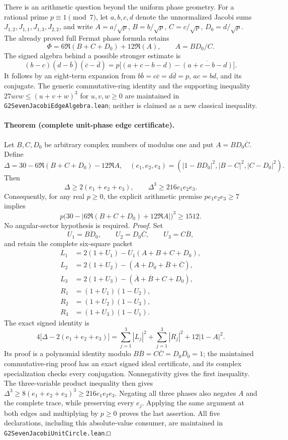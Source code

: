 \documentclass[11pt]{article}
\renewcommand{\square}{\mathord{\vcenter{\hrule\hbox{\vrule height .45em\kern .45em\vrule}\hrule}}}
\begin{document}
There is an arithmetic question beyond the uniform phase geometry.
For a rational prime \(p\equiv1\pmod7\), let \(a,b,c,d\) denote the
unnormalized Jacobi sums \(J_{1,2},J_{1,1},J_{1,3},J_{2,2}\), and
write \(A=a/\sqrt p\), \(B=b/\sqrt p\), \(C=c/\sqrt p\), \(D_0=d/\sqrt p\).
The already proved full Fermat phase formula retains
\[
 \Phi=6\Re(B+C+D_0)+12\Re(A),\qquad A=BD_0/C.
\]
The signed algebra behind a possible stronger estimate is
\[
 (b-c)(d-\overline b)(\overline c-\overline d)
   =p\bigl[(a+c-b-d)-\overline{(a+c-b-d)}\bigr].
\]
It follows by an eight-term expansion from
\(b\overline b=c\overline c=d\overline d=p\),
\(ac=bd\), and its conjugate. The generic commutative-ring identity
and the supporting inequality
\(27uvw\le(u+v+w)^3\) for \(u,v,w\ge0\) are maintained in
\texttt{G2SevenJacobiEdgeAlgebra.lean}; neither is claimed as a new
classical inequality.

\paragraph{Theorem (complete unit-phase edge certificate).}
Let \(B,C,D_0\) be arbitrary complex numbers of modulus one and put
\(A=BD_0\overline C\). Define
\[
 \Delta=30-6\Re(B+C+D_0)-12\Re A,\quad
 (e_1,e_2,e_3)=(|1-BD_0|^2,|B-C|^2,|C-D_0|^2).
\]
Then
\[
 \Delta\ge2(e_1+e_2+e_3),\qquad
 \Delta^3\ge216e_1e_2e_3.
\]
Consequently, for any real \(p\ge0\), the explicit arithmetic premise
\(pe_1e_2e_3\ge7\) implies
\[
 p\bigl(30-|6\Re(B+C+D_0)+12\Re A|\bigr)^3\ge1512.
\]
No angular-sector hypothesis is required.
\emph{Proof.}
Set
\[
 U_1=\overline{BD_0},\qquad U_2=D_0\overline C,\qquad
 U_3=C\overline B,
\]
and retain the complete six-square packet
\[
\begin{aligned}
 L_1&=2(1+U_1)-U_1(A+B+C+D_0),\\
 L_2&=2(1+U_2)-(A+D_0+\overline B+\overline C),\\
 L_3&=2(1+U_3)-(\overline A+\overline B+C+D_0),\\
 R_1&=(1+U_1)(1-U_2),\\
 R_2&=(1+U_2)(1-U_3),\\
 R_3&=(1+U_3)(1-U_1).
\end{aligned}
\]
The exact signed identity is
\[
 4\bigl[\Delta-2(e_1+e_2+e_3)\bigr]
 =\sum_{j=1}^3|L_j|^2+\sum_{j=1}^3|R_j|^2
   +12|1-A|^2.
\]
Its proof is a polynomial identity modulo
\(B\overline B=C\overline C=D_0\overline{D_0}=1\);
the maintained commutative-ring proof has an exact signed ideal
certificate, and its complex specialization checks every conjugation.
Nonnegativity gives the first inequality. The three-variable product
inequality then gives
\(\Delta^3\ge8(e_1+e_2+e_3)^3\ge216e_1e_2e_3\).
Negating all three phases also negates \(A\) and the complete trace,
while preserving every \(e_j\). Applying the same argument at both
edges and multiplying by \(p\ge0\) proves the last assertion.
All five declarations, including this absolute-value consumer, are
maintained in \texttt{G2SevenJacobiUnitCircle.lean}.\hfill\(\square\)
\end{document}
